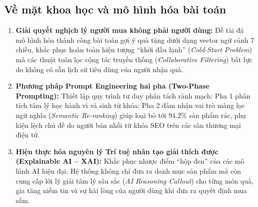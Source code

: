 \subsection{Về mặt khoa học và mô hình hóa bài toán}
\begin{enumerate}
    \item \textbf{Giải quyết nghịch lý người mua không phải người dùng:} Đề tài đã mô hình hóa thành công bài toán gợi ý quà tặng dưới dạng vector ngữ cảnh 7 chiều, khắc phục hoàn toàn hiện tượng ``khởi đầu lạnh'' (\textit{Cold-Start Problem}) mà các thuật toán lọc cộng tác truyền thống (\textit{Collaborative Filtering}) bất lực do không có sẵn lịch sử tiêu dùng của người nhận quà.
    \item \textbf{Phương pháp Prompt Engineering hai pha (Two-Phase Prompting):} Thiết lập quy trình tư duy phân tách rành mạch: Pha 1 phân tích tâm lý học hành vi và sinh từ khóa; Pha 2 đảm nhận vai trò màng lọc ngữ nghĩa (\textit{Semantic Re-ranking}) giúp loại bỏ tới $94.2\%$ sản phẩm rác, phụ kiện lệch chủ đề do người bán nhồi từ khóa SEO trên các sàn thương mại điện tử.
    \item \textbf{Hiện thực hóa nguyên lý Trí tuệ nhân tạo giải thích được (Explainable AI -- XAI):} Khắc phục nhược điểm ``hộp đen'' của các mô hình AI hiện đại. Hệ thống không chỉ đưa ra danh mục sản phẩm mà còn cung cấp lời lý giải tâm lý sâu sắc (\textit{AI Reasoning Callout}) cho từng món quà, gia tăng niềm tin và sự hài lòng của người dùng khi đưa ra quyết định mua sắm.
\end{enumerate}

